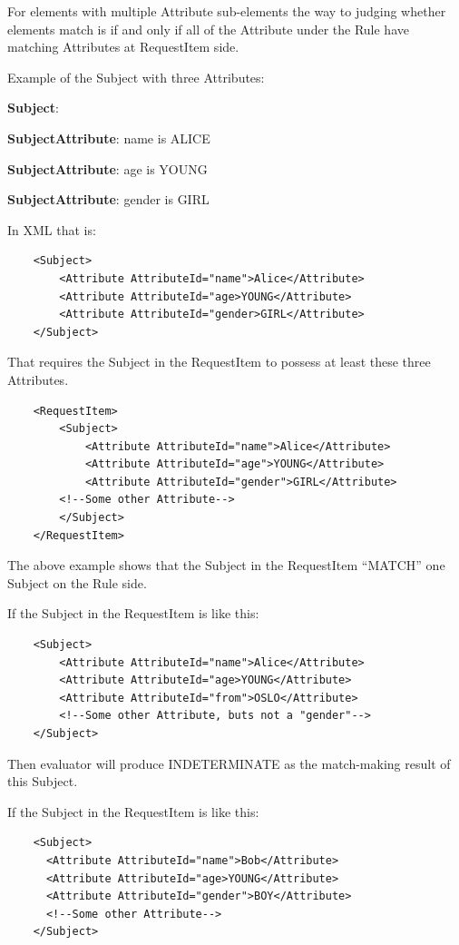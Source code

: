 \documentclass{article}                            %
\begin{document}
For elements with multiple Attribute sub-elements the way to judging whether elements match is if and only if all of the Attribute under the Rule have matching Attributes at RequestItem side.

Example of the Subject with three Attributes:

    \textbf{Subject}:

    \textbf{SubjectAttribute}: name is ALICE

    \textbf{SubjectAttribute}: age is YOUNG

    \textbf{SubjectAttribute}: gender is GIRL

In XML that is:

\begin{verbatim}
    <Subject>
        <Attribute AttributeId="name">Alice</Attribute>
        <Attribute AttributeId="age>YOUNG</Attribute>
        <Attribute AttributeId="gender>GIRL</Attribute>
    </Subject>
\end{verbatim}

That requires the Subject in the RequestItem to possess at least these three Attributes.

\begin{verbatim}
    <RequestItem>
        <Subject>
            <Attribute AttributeId="name">Alice</Attribute>
            <Attribute AttributeId="age">YOUNG</Attribute>
            <Attribute AttributeId="gender">GIRL</Attribute>
        <!--Some other Attribute-->
        </Subject>
    </RequestItem>
\end{verbatim}

The above example shows that the Subject in the RequestItem ``MATCH'' one Subject on the Rule side.

If the Subject in the RequestItem is like this:

\begin{verbatim}
    <Subject>
        <Attribute AttributeId="name">Alice</Attribute>
        <Attribute AttributeId="age>YOUNG</Attribute>
        <Attribute AttributeId="from">OSLO</Attribute>
        <!--Some other Attribute, buts not a "gender"-->
    </Subject>
\end{verbatim}

Then evaluator will produce INDETERMINATE as the match-making result of this Subject.

If the Subject in the RequestItem is like this:

\begin{verbatim}
    <Subject>
      <Attribute AttributeId="name">Bob</Attribute>
      <Attribute AttributeId="age>YOUNG</Attribute>
      <Attribute AttributeId="gender">BOY</Attribute>
      <!--Some other Attribute-->
    </Subject>
\end{verbatim}
\end{document}
